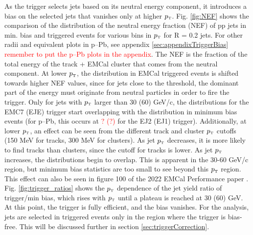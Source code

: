\documentclass[ALICE]{ALICE_analysis_notes}
\newcommand{\pT}{$p_{\mbox{\tiny T}}$\xspace}
\newcommand{\pPb}{{\mbox{p--Pb}}\xspace}
\newcommand{\pp}{pp\xspace}
\begin{document}
As the trigger selects jets based on its neutral energy component, it introduces a bias on the selected jets that vanishes only at higher \pT. Fig. \ref{fig:NEF} shows the comparison of the distribution of the neutral energy fraction (NEF) of \pp jets in min. bias and triggered events for various bins in \pT for R = 0.2 jets. For other radii and equivalent plots in \pPb, see appendix \ref{sec:appendixTriggerBias} \textcolor{red}{remember to put the \pPb plots in the appendix}. The NEF is the fraction of the total energy of the track + EMCal cluster that comes from the neutral component. At lower \pT, the distribution in EMCal triggered events is shifted towards higher NEF values, since for jets close to the threshold, the dominant part of the energy must originate from neutral particles in order to fire the trigger. Only for jets with \pT larger than 30 (60) GeV/c, the distributions for the EMC7 (EJE) trigger start overlapping with the distribution in minimum bias events (for \pPb, this occurs at \textcolor{red}{? (?)} for the EJ2 (EJ1) trigger). Additionally, at lower \pT, an effect can be seen from the different track and cluster \pT cutoffs (150 MeV for tracks, 300 MeV for clusters). As jet \pT decreases, it is more likely to find tracks than clusters, since the cutoff for tracks is lower. As jet \pT increases, the distributions begin to overlap. This is apparent in the 30-60 GeV/c region, but minimum bias statistics are too small to see beyond this \pT region. This effect can also be seen in figure 100 of the 2022 EMCal Performance paper \cite{EMCalPerformance}. Fig. \ref{fig:trigger_ratios} shows the \pT dependence of the jet yield ratio of trigger/min bias, which rises with \pT until a plateau is reached at 30 (60) GeV. At this point, the trigger is fully efficient, and the bias vanishes. For the analysis, jets are selected in triggered events only in the region where the trigger is bias-free. This will be discussed further in section \ref{sec:triggerCorrection}.
\end{document}
